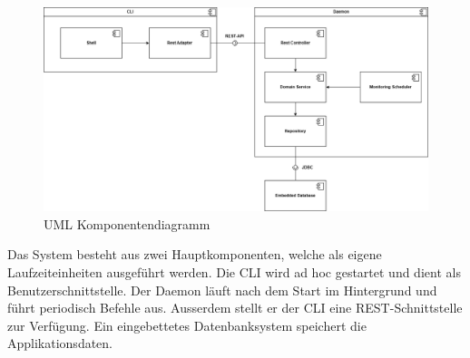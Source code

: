 \documentclass[a4paper,12pt]{report}
\begin{document}
    \begin{figure}[h]
        \centering
        \includegraphics[width=1\textwidth]{assets/comp-diag-tracesentry-v2}
        \caption{UML Komponentendiagramm}
        \label{fig:comp-diag}
    \end{figure}

    \textnormal{Das System besteht aus zwei Hauptkomponenten, welche als eigene Laufzeiteinheiten ausgeführt werden.
    Die CLI wird ad hoc gestartet und dient als Benutzerschnittstelle.
    Der Daemon läuft nach dem Start im Hintergrund und führt periodisch Befehle aus. Ausserdem stellt er der
    CLI eine REST-Schnittstelle zur Verfügung.
    Ein eingebettetes Datenbanksystem speichert die Applikationsdaten.}
\end{document}
